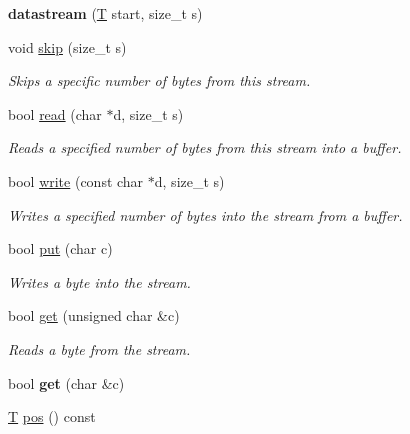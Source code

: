 \begin{DoxyCompactItemize}
\item 
\mbox{\label{classaacio_1_1datastream_af8d0d24cd68febccc51c7f447efead4e}} 
{\bfseries datastream} (\mbox{\hyperlink{struct_t}{T}} start, size\+\_\+t s)
\item 
void \mbox{\hyperlink{classaacio_1_1datastream_a61b35e6cf749800d83fb8623ae59572d}{skip}} (size\+\_\+t s)
\begin{DoxyCompactList}\small\item\em Skips a specific number of bytes from this stream. \end{DoxyCompactList}\item 
bool \mbox{\hyperlink{classaacio_1_1datastream_a5dd353d48ab5fd7953182198b4cfb849}{read}} (char $\ast$d, size\+\_\+t s)
\begin{DoxyCompactList}\small\item\em Reads a specified number of bytes from this stream into a buffer. \end{DoxyCompactList}\item 
bool \mbox{\hyperlink{classaacio_1_1datastream_a18871fe58368deca0fd61d0fd7616755}{write}} (const char $\ast$d, size\+\_\+t s)
\begin{DoxyCompactList}\small\item\em Writes a specified number of bytes into the stream from a buffer. \end{DoxyCompactList}\item 
bool \mbox{\hyperlink{classaacio_1_1datastream_aae43a09979f5e484a02d86b8a17a2587}{put}} (char c)
\begin{DoxyCompactList}\small\item\em Writes a byte into the stream. \end{DoxyCompactList}\item 
bool \mbox{\hyperlink{classaacio_1_1datastream_a57d58fd66643f7ba9f1058a01e36fa38}{get}} (unsigned char \&c)
\begin{DoxyCompactList}\small\item\em Reads a byte from the stream. \end{DoxyCompactList}\item 
\mbox{\label{classaacio_1_1datastream_ad2a71d3f68235efe1c5ff9998f5ed249}} 
bool {\bfseries get} (char \&c)
\item 
\mbox{\hyperlink{struct_t}{T}} \mbox{\hyperlink{classaacio_1_1datastream_a8870b1737d81ad372b45f1a2f097d119}{pos}} () const

\end{DoxyCompactItemize}
